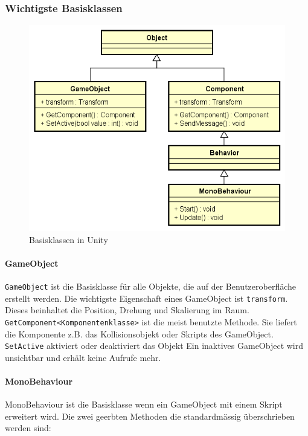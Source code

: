\subsubsection{Wichtigste Basisklassen}

\begin{figure}[H]
\includegraphics[scale=0.5]{diagramme/unitybaseclasses.png}
\caption{Basisklassen in Unity}
\end{figure}

\paragraph{GameObject}
\lstinline{GameObject} ist die Basisklasse für alle Objekte, die auf der Benutzeroberfläche erstellt werden.
Die wichtigste Eigenschaft eines GameObject ist \lstinline{transform}.
Dieses beinhaltet die Position, Drehung und Skalierung im Raum.
\lstinline{GetComponent<Komponentenklasse>} ist die meist benutzte Methode. 
Sie liefert die Komponente z.B. das Kollisionsobjekt oder Skripts des GameObject. 
\lstinline{SetActive} aktiviert oder deaktiviert das Objekt
Ein inaktives GameObject wird unsichtbar und erhält keine Aufrufe mehr.

\paragraph{MonoBehaviour}
MonoBehaviour ist die Basisklasse wenn ein GameObject mit einem Skript erweitert wird.
Die zwei geerbten Methoden die standardmässig überschrieben werden sind:

